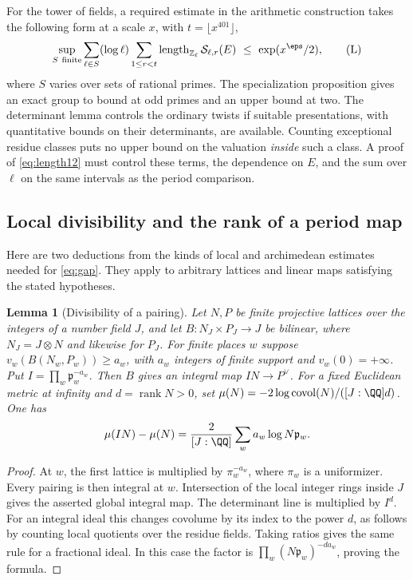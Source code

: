 \documentclass[a4paper,11pt]{article}
\newtheorem{lemma}[proposition]{Lemma}
\theoremstyle{definition}
\theoremstyle{remark}
\newcommand{\ZZ}{\mathbb Z}\newcommand{\ord}{\operatorname{ord}}
\newcommand{\len}{\operatorname{length}}\newcommand{\Res}{\operatorname*{Res}}
\numberwithin{equation}{section}
\begin{document}
For the tower of fields, a required estimate in the arithmetic construction takes the following form at a scale \(x\), with \(t=\lfloor x^{401}\rfloor\),
\begin{equation*}
 \sup_{S\ \mathrm{finite}}\sum_{\ell\in S}(\log\ell)
           \sum_{1\le r<t}\len_{\ZZ_\ell}\mathcal S_{\ell,r}(E)
                \ \le\ \exp(x^\eps/2),                                  \tag{L}\label{eq:length12}
\end{equation*}
where \(S\) varies over sets of rational primes. The specialization proposition gives an exact group to bound at odd primes and an upper bound at two. The determinant lemma controls the ordinary twists if suitable presentations, with quantitative bounds on their determinants, are available. Counting exceptional residue classes puts no upper bound on the valuation \emph{inside} such a class. A proof of \eqref{eq:length12} must control these terms, the dependence on \(E\), and the sum over \(\ell\) on the same intervals as the period comparison.

\subsection{Local divisibility and the rank of a period map}\label{nav:I-27}
\label{sec:geom11}
Here are two deductions from the kinds of local and archimedean estimates needed for \eqref{eq:gap}. They apply to arbitrary lattices and linear maps satisfying the stated hypotheses.

\begin{lemma}[Divisibility of a pairing]\label{lem:lattice11}
Let \(N,P\) be finite projective lattices over the integers of a number field \(J\), and let \(B:N_J\times P_J\to J\) be bilinear, where \(N_J=J\otimes N\) and likewise for \(P_J\). For finite places \(w\) suppose \(v_w(B(N_w,P_w))\ge a_w\), with \(a_w\) integers of finite support and \(v_w(0)=+\infty\). Put \(I=\prod_w\mathfrak p_w^{-a_w}\). Then \(B\) gives an integral map \(IN\to P^\vee\). For a fixed Euclidean metric at infinity and \(d=\operatorname{rank} N>0\), set \(\mu(N)=-2\log\operatorname{covol}(N)/([J:\QQ]d)\). One has
\[
 \mu(IN)-\mu(N)=\frac{2}{[J:\QQ]}\sum_w a_w\log N\mathfrak p_w .
\]
\end{lemma}
\begin{proof}
At \(w\), the first lattice is multiplied by \(\pi_w^{-a_w}\), where \(\pi_w\) is a uniformizer. Every pairing is then integral at \(w\). Intersection of the local integer rings inside \(J\) gives the asserted global integral map. The determinant line is multiplied by \(I^d\). For an integral ideal this changes covolume by its index to the power \(d\), as follows by counting local quotients over the residue fields. Taking ratios gives the same rule for a fractional ideal. In this case the factor is \(\prod_w(N\mathfrak p_w)^{-da_w}\), proving the formula.
\end{proof}
\end{document}
